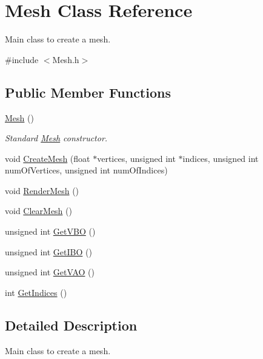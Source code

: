 \hypertarget{class_mesh}{}\section{Mesh Class Reference}
\label{class_mesh}


Main class to create a mesh.  




{\ttfamily \#include $<$Mesh.\+h$>$}

\subsection*{Public Member Functions}
\begin{DoxyCompactItemize}
\item 
\mbox{\label{class_mesh_a2af137f1571af89172b9c102302c416b}} 
\mbox{\hyperlink{class_mesh_a2af137f1571af89172b9c102302c416b}{Mesh}} ()
\begin{DoxyCompactList}\small\item\em Standard \mbox{\hyperlink{class_mesh}{Mesh}} constructor. \end{DoxyCompactList}\item 
void \mbox{\hyperlink{class_mesh_a25d4dde7c1ad47fb56ebb3a59edd2460}{Create\+Mesh}} (float $\ast$vertices, unsigned int $\ast$indices, unsigned int num\+Of\+Vertices, unsigned int num\+Of\+Indices)
\item 
void \mbox{\hyperlink{class_mesh_a75ccdfd3c16df862abb90d6046abcdb4}{Render\+Mesh}} ()
\item 
void \mbox{\hyperlink{class_mesh_afa7292342a61bc1cca667be6c00d73d2}{Clear\+Mesh}} ()
\item 
unsigned int \mbox{\hyperlink{class_mesh_a4970bf6ecdcc4bc417e49524393f1cea}{Get\+V\+BO}} ()
\item 
unsigned int \mbox{\hyperlink{class_mesh_ac054a1c2159f4fb5dfadedd9453b2256}{Get\+I\+BO}} ()
\item 
unsigned int \mbox{\hyperlink{class_mesh_aafa13fa13ca5fb5e15b544ae1870da45}{Get\+V\+AO}} ()
\item 
int \mbox{\hyperlink{class_mesh_a70161b8fbe973d74f2509b5524e16e79}{Get\+Indices}} ()
\end{DoxyCompactItemize}


\subsection{Detailed Description}
Main class to create a mesh. 

